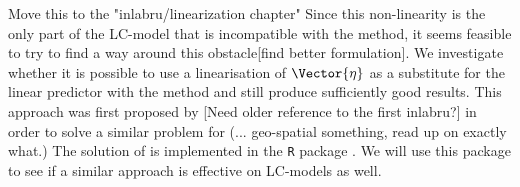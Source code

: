 \textcolor{myDarkGreen}{Move this to the "inlabru/linearization chapter"}
Since this non-linearity is the only part of the LC-model that is incompatible with the \inla method, it seems feasible to try to find a way around this obstacle[find better formulation]. We investigate whether it is possible to use a linearisation of $\Vector{\eta}$ as a substitute for the linear predictor with the \inla method and still produce sufficiently good results. This approach was first proposed by \cite{Inlabru} [Need older reference to the first inlabru?] in order to solve a similar problem for (... geo-spatial something, read up on exactly what.) The solution of \cite{Inlabru} is implemented in the \texttt{R} package \inlabru. We will use this package to see if a similar approach is effective on LC-models as well.     

